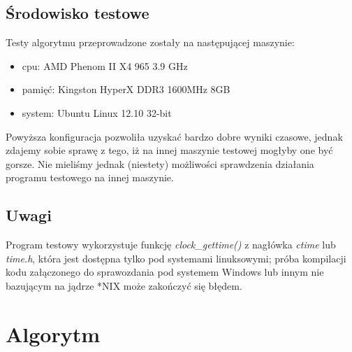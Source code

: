 \documentclass[a4paper,11pt]{article}
\begin{document}
\subsection{Środowisko testowe}
Testy algorytmu przeprowadzone zostały na następującej maszynie:\\
\begin{itemize}
\item cpu: AMD Phenom II X4 965 3.9 GHz
\item pamięć: Kingston HyperX DDR3 1600MHz 8GB
\item system: Ubuntu Linux 12.10 32-bit
\end{itemize}
Powyższa konfiguracja pozwoliła uzyskać bardzo dobre wyniki czasowe, jednak zdajemy sobie sprawę z tego, iż na innej maszynie testowej mogłyby one być gorsze. Nie mieliśmy jednak (niestety) możliwości sprawdzenia działania programu testowego na innej maszynie.
\subsection{Uwagi}
Program testowy wykorzystuje funkcję \emph{clock\_gettime()} z nagłówka \emph{ctime} lub \emph{time.h}, która jest dostępna tylko pod systemami linuksowymi; próba kompilacji kodu załączonego do sprawozdania pod systemem Windows lub innym nie bazującym na jądrze *NIX może zakończyć się błędem.
\section{Algorytm}
\end{document}
